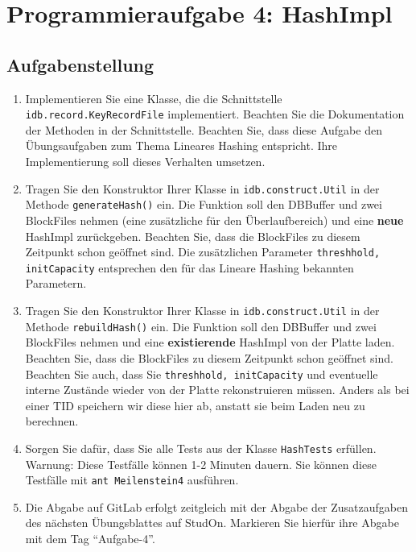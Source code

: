 \section{Programmieraufgabe 4: HashImpl}

\subsection{Aufgabenstellung}
\begin{enumerate}
	\item Implementieren Sie eine Klasse, die die Schnittstelle \beamertxt{\linebreak}\texttt{idb.record.KeyRecordFile} implementiert.
		Beachten Sie die Dokumentation der Methoden in der Schnittstelle. Beachten Sie, dass diese Aufgabe den Übungsaufgaben zum Thema Lineares Hashing entspricht.
		Ihre Implementierung soll dieses Verhalten umsetzen.
	\item Tragen Sie den Konstruktor Ihrer Klasse in \texttt{idb.construct.Util} in der Methode \texttt{generateHash()} ein.
		Die Funktion soll den DBBuffer und zwei BlockFiles nehmen (eine zusätzliche für den Überlaufbereich) und eine \textbf{neue} HashImpl zurückgeben.
		Beachten Sie, dass die BlockFiles zu diesem Zeitpunkt schon geöffnet sind.
		Die zusätzlichen Parameter \texttt{threshhold, initCapacity} entsprechen den für das Lineare Hashing bekannten Parametern.
	\item Tragen Sie den Konstruktor Ihrer Klasse in \texttt{idb.construct.Util} in der Methode \texttt{rebuildHash()} ein.
		Die Funktion soll den DBBuffer und zwei BlockFiles nehmen und eine \textbf{existierende} HashImpl von der Platte laden.
		Beachten Sie, dass die BlockFiles zu diesem Zeitpunkt schon geöffnet sind.
		Beachten Sie auch, dass Sie \texttt{threshhold, initCapacity} und eventuelle interne Zustände wieder von der Platte rekonstruieren müssen.
		Anders als bei einer TID speichern wir diese hier ab, anstatt sie beim Laden neu zu berechnen.
	\item Sorgen Sie dafür, dass Sie alle Tests aus der Klasse \texttt{HashTests} erfüllen. Warnung: Diese Testfälle können 1-2 Minuten dauern.
	Sie können diese Testfälle mit \lstinline|ant Meilenstein4| ausführen.
	\item Die Abgabe auf GitLab erfolgt zeitgleich mit der Abgabe der Zusatzaufgaben des nächsten Übungsblattes auf StudOn. Markieren Sie hierfür ihre Abgabe mit dem Tag "`Aufgabe-4"'.
\end{enumerate}

